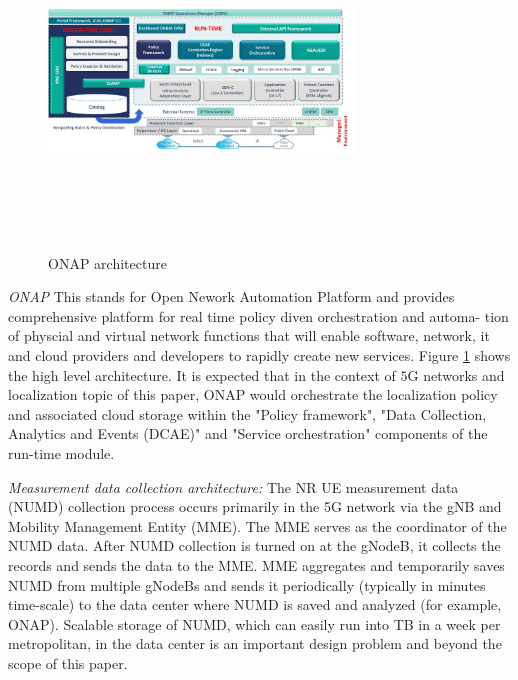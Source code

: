 \documentclass[conference, 10pt]{IEEEtran}
\begin{document}
\begin{figure}[t]
\begin{center}
\includegraphics[height=3.5in,width=3.2in]{./ONAP-architecture.png}
\caption{\label{fig:onap_arch}
{\small ONAP architecture}}
\end{center}
\end{figure}



{\em ONAP} This stands for Open Nework Automation Platform and provides comprehensive platform for real time policy diven orchestration and automa-
tion of physcial and virtual network functions that will enable software, network,
it and cloud providers and developers to rapidly create new services. Figure \ref{fig:onap_arch} shows the high level architecture. It is expected that in the context of $5$G networks and localization topic of this paper, ONAP would orchestrate the localization policy and associated cloud storage within the "Policy framework", "Data Collection, Analytics and Events (DCAE)" and "Service orchestration" components of the run-time module. 

{\em Measurement data collection architecture:} The NR UE measurement data (NUMD) collection process occurs primarily in the 5G network via the gNB and Mobility Management Entity (MME). The MME serves as the coordinator of the NUMD data.
After NUMD collection is turned on at the gNodeB, it collects the records and sends
the data to the MME. MME aggregates and temporarily saves NUMD from multiple
gNodeBs and sends it periodically (typically in minutes time-scale) to the data
center  where NUMD is saved and analyzed (for example, ONAP). Scalable storage of NUMD, which can easily
run into TB in a week per metropolitan, in the data center is an important design
problem and beyond the scope of this paper.
\end{document}
